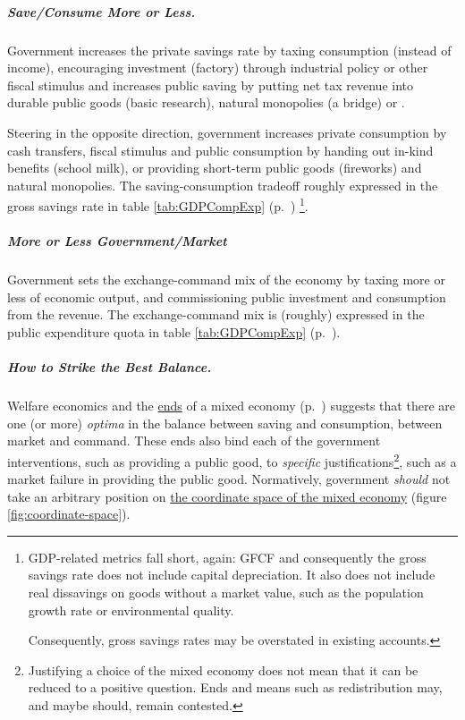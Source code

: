 \subparagraph[Save More or Less]{Save/Consume More or Less.} Government increases the private savings rate by taxing consumption (instead of income), encouraging investment (factory) through industrial policy or other fiscal stimulus and increases public saving by putting net tax revenue into durable public goods (basic research), natural monopolies (a bridge) or .

Steering in the opposite direction, government increases private consumption by cash transfers, fiscal stimulus and public consumption by handing out in-kind benefits (school milk), or providing short-term public goods (fireworks) and natural monopolies. The saving-consumption tradeoff roughly expressed in the gross savings rate in table \ref{tab:GDPCompExp} (p.~\pageref{tab:GDPCompExp}) \footnote{
	GDP-related metrics fall short, again: \gls{GFCF} and consequently the gross savings rate does not include capital depreciation. It also does not include real dissavings on goods without a market value, such as the population growth rate or environmental quality.

	Consequently, gross savings rates may be overstated in existing accounts.}.


\subparagraph[Exchange-Command Mix]{More or Less Government/Market} Government sets the exchange-command mix of the economy by taxing more or less of economic output, and commissioning public investment and consumption from the revenue. The exchange-command mix is (roughly) expressed in the public expenditure quota in table \ref{tab:GDPCompExp} (p.~\pageref{tab:GDPCompExp}).

\subparagraph[Optima]{How to Strike the Best Balance.} Welfare economics and the \hyperref[sec:ends]{ends} of a mixed economy (p.~\pageref{sec:ends}) suggests that there are one (or more) \emph{optima} in the balance between saving and consumption, between market and command. These ends also bind each of the government interventions, such as providing a public good, to \emph{specific} justifications\footnote{
	Justifying a choice of the mixed economy does not mean that it can be reduced to a positive question. Ends and means such as redistribution may, and maybe should, remain contested.},
such as a market failure in providing the public good. Normatively, government \emph{should} not take an arbitrary position on \hyperref[fig:coordinate-space]{the coordinate space of the mixed economy} (figure \ref{fig:coordinate-space}).

